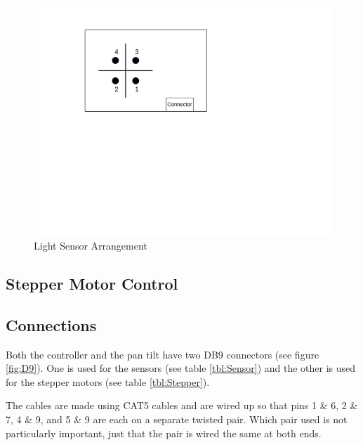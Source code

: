 \documentclass[10pt, openany]{book}
\begin{document}
\begin{figure}[htb]
  \begin{center}
    \includegraphics[scale=0.5]{Sensors.pdf}
    \caption{Light Sensor Arrangement}
    \label{fig:Sensors}
  \end{center}
\end{figure}

\subsection{Stepper Motor Control}

\subsection{Connections}
Both the controller and the pan tilt have two DB9 connectors (see figure \ref{fig:D9}).  One is used for the sensors (see table \ref{tbl:Sensor}) and the other is used for the stepper motors (see table \ref{tbl:Stepper}).

The cables are made using CAT5 cables and are wired up so that pins 1 \& 6, 2 \& 7, 4 \& 9, and 5 \& 9 are each on a separate twisted pair.  Which pair used is not particularly important, just that the pair is wired the same at both ends.
\end{document}
